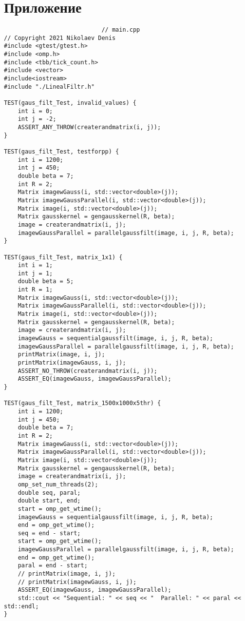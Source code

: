 \documentclass{report}
\begin{document}
\section*{Приложение}
\begin{lstlisting}
							// main.cpp
// Copyright 2021 Nikolaev Denis
#include <gtest/gtest.h>
#include <omp.h>
#include <tbb/tick_count.h>
#include <vector>
#include<iostream>
#include "./LinealFiltr.h"

TEST(gaus_filt_Test, invalid_values) {
    int i = 0;
    int j = -2;
    ASSERT_ANY_THROW(createrandmatrix(i, j));
}

TEST(gaus_filt_Test, testforpp) {
    int i = 1200;
    int j = 450;
    double beta = 7;
    int R = 2;
    Matrix imagewGauss(i, std::vector<double>(j));
    Matrix imagewGaussParallel(i, std::vector<double>(j));
    Matrix image(i, std::vector<double>(j));
    Matrix gausskernel = gengausskernel(R, beta);
    image = createrandmatrix(i, j);
    imagewGaussParallel = parallelgaussfilt(image, i, j, R, beta);
}

TEST(gaus_filt_Test, matrix_1x1) {
    int i = 1;
    int j = 1;
    double beta = 5;
    int R = 1;
    Matrix imagewGauss(i, std::vector<double>(j));
    Matrix imagewGaussParallel(i, std::vector<double>(j));
    Matrix image(i, std::vector<double>(j));
    Matrix gausskernel = gengausskernel(R, beta);
    image = createrandmatrix(i, j);
    imagewGauss = sequentialgaussfilt(image, i, j, R, beta);
    imagewGaussParallel = parallelgaussfilt(image, i, j, R, beta);
    printMatrix(image, i, j);
    printMatrix(imagewGauss, i, j);
    ASSERT_NO_THROW(createrandmatrix(i, j));
    ASSERT_EQ(imagewGauss, imagewGaussParallel);
}

TEST(gaus_filt_Test, matrix_1500x1000x5thr) {
    int i = 1200;
    int j = 450;
    double beta = 7;
    int R = 2;
    Matrix imagewGauss(i, std::vector<double>(j));
    Matrix imagewGaussParallel(i, std::vector<double>(j));
    Matrix image(i, std::vector<double>(j));
    Matrix gausskernel = gengausskernel(R, beta);
    image = createrandmatrix(i, j);
    omp_set_num_threads(2);
    double seq, paral;
    double start, end;
    start = omp_get_wtime();
    imagewGauss = sequentialgaussfilt(image, i, j, R, beta);
    end = omp_get_wtime();
    seq = end - start;
    start = omp_get_wtime();
    imagewGaussParallel = parallelgaussfilt(image, i, j, R, beta);
    end = omp_get_wtime();
    paral = end - start;
    // printMatrix(image, i, j);
    // printMatrix(imagewGauss, i, j);
    ASSERT_EQ(imagewGauss, imagewGaussParallel);
    std::cout << "Sequential: " << seq << "  Parallel: " << paral << std::endl;
}


\end{lstlisting}
\end{document}
